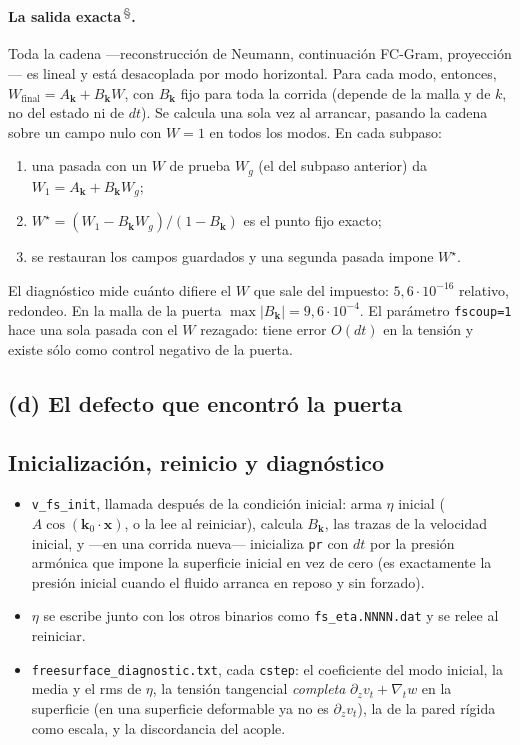 \documentclass[11pt,a4paper]{article}
\newcommand{\archivo}[1]{\nolinkurl{#1}}
\newcommand{\propio}{\textsuperscript{\textcolor{gray}{\,\S}}}
\begin{document}
\paragraph{La salida exacta\propio.} Toda la cadena ---reconstrucción de Neumann,
continuación FC-Gram, proyección--- es lineal y está desacoplada por modo horizontal. Para
cada modo, entonces, $W_{\text{final}}=A_{\mathbf k}+B_{\mathbf k}W$, con $B_{\mathbf k}$
fijo para toda la corrida (depende de la malla y de $k$, no del estado ni de $dt$). Se
calcula una sola vez al arrancar, pasando la cadena sobre un campo nulo con $W=1$ en todos
los modos. En cada subpaso:
\begin{enumerate}
\item una pasada con un $W$ de prueba $W_g$ (el del subpaso anterior) da
  $W_1=A_{\mathbf k}+B_{\mathbf k}W_g$;
\item $W^\star=(W_1-B_{\mathbf k}W_g)/(1-B_{\mathbf k})$ es el punto fijo exacto;
\item se restauran los campos guardados y una segunda pasada impone $W^\star$.
\end{enumerate}
El diagnóstico mide cuánto difiere el $W$ que sale del impuesto: $5{,}6\cdot10^{-16}$
relativo, redondeo. En la malla de la puerta $\max|B_{\mathbf k}|=9{,}6\cdot10^{-4}$. El
parámetro \texttt{fscoup=1} hace una sola pasada con el $W$ rezagado: tiene error $O(dt)$ en
la tensión y existe sólo como control negativo de la puerta.

\subsection{(d) El defecto que encontró la puerta}
\label{sec:defecto}



\subsection{Inicialización, reinicio y diagnóstico}

\begin{itemize}
\item \texttt{v\_fs\_init}, llamada después de la condición inicial: arma $\eta$ inicial
  ($A\cos(\mathbf k_0\cdot\mathbf x)$, o la lee al reiniciar), calcula $B_{\mathbf k}$, las
  trazas de la velocidad inicial, y ---en una corrida nueva--- inicializa \texttt{pr} con
  $dt$ por la presión armónica que impone la superficie inicial en vez de cero (es
  exactamente la presión inicial cuando el fluido arranca en reposo y sin forzado).
\item $\eta$ se escribe junto con los otros binarios como \archivo{fs_eta.NNNN.dat} y se
  relee al reiniciar.
\item \archivo{freesurface_diagnostic.txt}, cada \texttt{cstep}: el coeficiente del modo
  inicial, la media y el rms de $\eta$, la tensión tangencial \emph{completa}
  $\partial_zv_t+\nabla_tw$ en la superficie (en una superficie deformable ya no es
  $\partial_zv_t$), la de la pared rígida como escala, y la discordancia del acople.
\end{itemize}
\end{document}
